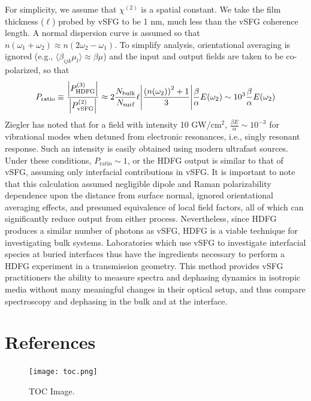 \documentclass[aip, jcp, reprint, onecolumn, nofootinbib]{revtex4-2}
\begin{document}
For simplicity, we assume that $\chi^{(2)}$ is a spatial constant. 
We take the film thickness ($\ell$) probed by vSFG to be 1 nm, much less than the vSFG coherence length.\cite{RN133}
A normal dispersion curve is assumed so that $n(\omega_1+\omega_2) \approx n(2\omega_2-\omega_1)$.
To simplify analysis, orientational averaging is ignored (e.g., $\langle \beta_{ijk} \mu_{l} \rangle \approx \beta \mu$) and the input and output fields are taken to be co-polarized, so that
\begin{equation}
	P_\text{ratio} \equiv \frac{\abs{P^{(3)}_{\text{HDFG}}}}{\abs{P^{(2)}_{\text{vSFG}}}} \approx 2 \frac{N_\text{bulk}}{N_\text{surf}} \ell \abs{\frac{\left(n(\omega_2)\right)^2 + 1}{3}} \frac{\beta}{\alpha} E(\omega_2) \sim 10^3 \frac{\beta}{\alpha} E(\omega_2)\\
\end{equation}
Ziegler has noted that for a field with intensity 10 GW/cm$^{2}$, $\frac{\beta E}{\alpha} \sim 10^{-3} $ for vibrational modes when detuned from electronic resonances, i.e., singly resonant response. \cite{RN515}
Such an intensity is easily obtained using modern ultrafast sources.
Under these conditions, $P_\text{ratio} \sim 1$, or the HDFG output is similar to that of vSFG, assuming only interfacial contributions in vSFG.
It is important to note that this calculation assumed negligible dipole and Raman polarizability dependence upon the distance from surface normal, ignored orientational averaging effects, and presumed equivalence of local field factors, all of which can significantly reduce output from either process. 
Nevertheless, since HDFG produces a similar number of photons as vSFG, HDFG is a viable technique for investigating bulk systems.
Laboratories which use vSFG to investigate interfacial species at buried interfaces thus have the ingredients necessary to perform a HDFG experiment in a transmission geometry. \cite{Piontek2023_1}
This method provides vSFG practitioners the ability to measure spectra and dephasing dynamics in isotropic media without many meaningful changes in their optical setup, and thus compare spectroscopy and dephasing in the bulk and at the interface.



\section{References}



\begin{figure}[!htbp]
	\centering
	\texttt{[image: toc.png]}
	\caption{
		TOC Image.
	} 
	\label{fig:toc}
\end{figure}
\end{document}
